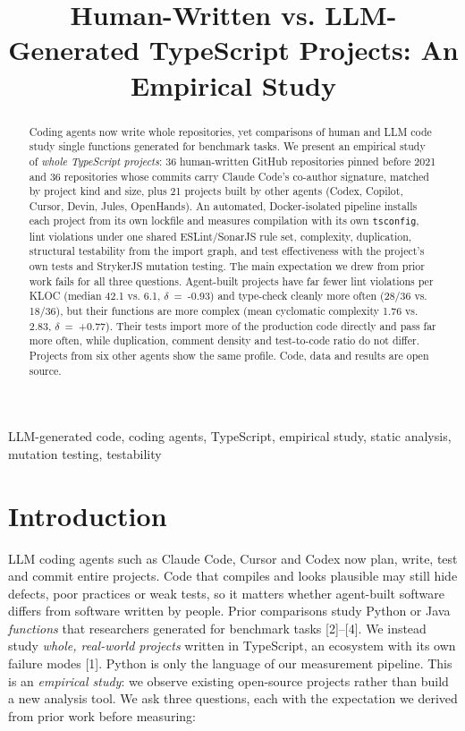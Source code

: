 \documentclass[10pt,conference]{IEEEtran}
\begin{document}
\title{Human-Written vs. LLM-Generated TypeScript Projects: An Empirical Study}
\author{}
\maketitle

\begin{abstract}
Coding agents now write whole repositories, yet comparisons of human and LLM code study single functions generated for benchmark tasks. We present an empirical study of \emph{whole TypeScript projects}: 36 human-written GitHub repositories pinned before 2021 and 36 repositories whose commits carry Claude Code's co-author signature, matched by project kind and size, plus 21 projects built by other agents (Codex, Copilot, Cursor, Devin, Jules, OpenHands). An automated, Docker-isolated pipeline installs each project from its own lockfile and measures compilation with its own \texttt{tsconfig}, lint violations under one shared ESLint/SonarJS rule set, complexity, duplication, structural testability from the import graph, and test effectiveness with the project's own tests and StrykerJS mutation testing. The main expectation we drew from prior work fails for all three questions. Agent-built projects have far fewer lint violations per KLOC (median 42.1 vs. 6.1, $\delta$~=~-0.93) and type-check cleanly more often (28/36 vs. 18/36), but their functions are more complex (mean cyclomatic complexity 1.76 vs. 2.83, $\delta$~=~+0.77). Their tests import more of the production code directly and pass far more often, while duplication, comment density and test-to-code ratio do not differ. Projects from six other agents show the same profile. Code, data and results are open source.
\end{abstract}
\begin{IEEEkeywords}
LLM-generated code, coding agents, TypeScript, empirical study, static analysis, mutation testing, testability
\end{IEEEkeywords}

\section{Introduction}
LLM coding agents such as Claude Code, Cursor and Codex now plan, write, test and commit entire projects. Code that compiles and looks plausible may still hide defects, poor practices or weak tests, so it matters whether agent-built software differs from software written by people. Prior comparisons study Python or Java \emph{functions} that researchers generated for benchmark tasks [2]--[4]. We instead study \emph{whole, real-world projects} written in TypeScript, an ecosystem with its own failure modes [1]. Python is only the language of our measurement pipeline. This is an \emph{empirical study}: we observe existing open-source projects rather than build a new analysis tool. We ask three questions, each with the expectation we derived from prior work before measuring:
\end{document}
